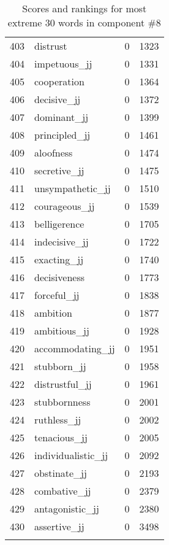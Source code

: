 \begin{longtable}[!htbp]{| rlr@{.}l |}
    403 & distrust & 0 & 1323 \\
    404 & impetuous\_jj & 0 & 1331 \\
    405 & cooperation & 0 & 1364 \\
    406 & decisive\_jj & 0 & 1372 \\
    407 & dominant\_jj & 0 & 1399 \\
    408 & principled\_jj & 0 & 1461 \\
    409 & aloofness & 0 & 1474 \\
    410 & secretive\_jj & 0 & 1475 \\
    411 & unsympathetic\_jj & 0 & 1510 \\
    412 & courageous\_jj & 0 & 1539 \\
    413 & belligerence & 0 & 1705 \\
    414 & indecisive\_jj & 0 & 1722 \\
    415 & exacting\_jj & 0 & 1740 \\
    416 & decisiveness & 0 & 1773 \\
    417 & forceful\_jj & 0 & 1838 \\
    418 & ambition & 0 & 1877 \\
    419 & ambitious\_jj & 0 & 1928 \\
    420 & accommodating\_jj & 0 & 1951 \\
    421 & stubborn\_jj & 0 & 1958 \\
    422 & distrustful\_jj & 0 & 1961 \\
    423 & stubbornness & 0 & 2001 \\
    424 & ruthless\_jj & 0 & 2002 \\
    425 & tenacious\_jj & 0 & 2005 \\
    426 & individualistic\_jj & 0 & 2092 \\
    427 & obstinate\_jj & 0 & 2193 \\
    428 & combative\_jj & 0 & 2379 \\
    429 & antagonistic\_jj & 0 & 2380 \\
    430 & assertive\_jj & 0 & 3498 \\
    \hline
    \caption{Scores and rankings for most extreme 30 words in component \#8} \\
\end{longtable}
